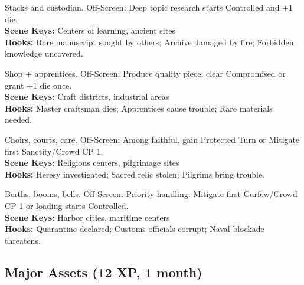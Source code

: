 \documentclass[12pt]{article}
\begin{document}
\begin{description}[leftmargin=*]
  \item[\textbf{Library Archive}] Stacks and custodian. Off-Screen: Deep topic research starts Controlled and +1 die. \\
  \textbf{Scene Keys:} Centers of learning, ancient sites \\
  \textbf{Hooks:} Rare manuscript sought by others; Archive damaged by fire; Forbidden knowledge uncovered.

  \item[\textbf{Craftsman's Quarter}] Shop + apprentices. Off-Screen: Produce quality piece: clear Compromised or grant +1 die once. \\
  \textbf{Scene Keys:} Craft districts, industrial areas \\
  \textbf{Hooks:} Master craftsman dies; Apprentices cause trouble; Rare materials needed.

  \item[\textbf{Temple Complex}] Choirs, courts, care. Off-Screen: Among faithful, gain Protected Turn or Mitigate first Sanctity/Crowd CP 1. \\
  \textbf{Scene Keys:} Religious centers, pilgrimage sites \\
  \textbf{Hooks:} Heresy investigated; Sacred relic stolen; Pilgrims bring trouble.

  \item[\textbf{Port Authority}] Berths, booms, bells. Off-Screen: Priority handling: Mitigate first Curfew/Crowd CP 1 or loading starts Controlled. \\
  \textbf{Scene Keys:} Harbor cities, maritime centers \\
  \textbf{Hooks:} Quarantine declared; Customs officials corrupt; Naval blockade threatens.
\end{description}

\subsection*{Major Assets (12 XP, 1 month)}
\end{document}
